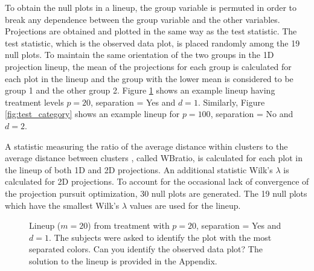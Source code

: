 To obtain the null plots in a lineup, the group variable is permuted in order to break any dependence between the group variable and the other variables. Projections are obtained and plotted in the same way as the test statistic. The test statistic, which is the observed data plot, is placed randomly among the 19 null plots. To maintain the same orientation of the two groups in the 1D projection lineup,  the mean of the projections for each group is calculated for each plot in the lineup and the group with the lower mean is considered to be group 1 and the other group 2. Figure \ref{fig:test_category_1d} shows an example lineup having treatment levels $p = 20$, separation = Yes and $d = 1$. Similarly, Figure \ref{fig:test_category} shows an example lineup for $p =100$, separation = No and $d = 2$.

A statistic measuring the ratio of the average distance within clusters to the average distance between clusters \citep{hennig:2010}, called WBratio, is calculated for each plot in the lineup of both 1D and 2D projections. An additional statistic Wilk's $\lambda$ \citep[e.g.][]{JW02} is calculated for 2D projections. To account for the occasional lack of convergence of the projection pursuit optimization, 30 null plots are generated. The 19 null plots which have the smallest Wilk's $\lambda$ values are used for the lineup. 

\begin{figure}[hbtp]
   \centering
       \caption{Lineup  ($m=20$) from treatment with $p = 20$, separation = Yes and $d = 1$. The subjects were asked to identify the plot with the most separated colors. Can you identify the observed data plot? The solution to the lineup is provided in the Appendix. }
     \label{fig:test_category_1d}
\end{figure}


